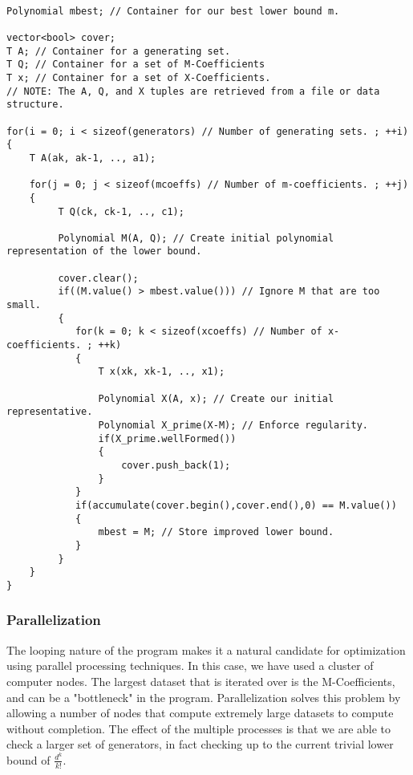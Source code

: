 \begin{lstlisting}

Polynomial mbest; // Container for our best lower bound m.

vector<bool> cover;
T A; // Container for a generating set.
T Q; // Container for a set of M-Coefficients
T x; // Container for a set of X-Coefficients.
// NOTE: The A, Q, and X tuples are retrieved from a file or data structure.

for(i = 0; i < sizeof(generators) // Number of generating sets. ; ++i)
{
    T A(ak, ak-1, .., a1);

    for(j = 0; j < sizeof(mcoeffs) // Number of m-coefficients. ; ++j)
    {
         T Q(ck, ck-1, .., c1); 
 
         Polynomial M(A, Q); // Create initial polynomial representation of the lower bound.
   
         cover.clear(); 
         if((M.value() > mbest.value())) // Ignore M that are too small.
         {
            for(k = 0; k < sizeof(xcoeffs) // Number of x-coefficients. ; ++k)
            {
                T x(xk, xk-1, .., x1);

                Polynomial X(A, x); // Create our initial representative.
                Polynomial X_prime(X-M); // Enforce regularity.
                if(X_prime.wellFormed())
                { 
                    cover.push_back(1);
                }
            }
            if(accumulate(cover.begin(),cover.end(),0) == M.value())
            {
                mbest = M; // Store improved lower bound.
            }
         }
    }
}

\end{lstlisting}

\subsubsection*{Parallelization}

The looping nature of the program makes it a natural candidate for optimization using parallel processing techniques. In this case, we have used a cluster of computer nodes. The largest dataset that is iterated over is the M-Coefficients, and can be a "bottleneck" in the program. Parallelization solves this problem by allowing a number of nodes that compute extremely large datasets to compute without completion. The effect of the multiple processes is that we are able to check a larger set of generators, in fact checking up to the current trivial lower bound of $\frac{d^k}{k!}$.


